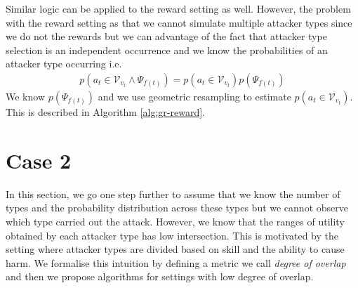 \documentclass[sigconf]{aamas}  %
\newcommand{\cal}[1]{\mathcal{#1}}
\theoremstyle{definition}
\theoremstyle{definition}
\begin{document}
Similar logic can be applied to the reward setting as well. However, the problem with the reward setting as that we cannot simulate multiple attacker types since we do not the rewards but we can advantage of the fact that attacker type selection is an independent occurrence and we know the probabilities of an attacker type occurring i.e.
\begin{align*}
    p(a_t \in \cal V_{v_t} \land \Psi_{f(t)}) = p(a_t \in \cal V_{v_t}) p(\Psi_{f(t)}) 
\end{align*}
We know $p(\Psi_{f(t)})$ and we use geometric resampling to estimate $p(a_t \in \cal V_{v_t})$. This is described in Algorithm \ref{alg:gr-reward}.


\section{Case 2}\label{sec:case2}
In this section, we go one step further to assume that we know the number of types and the probability distribution across these types but we cannot observe which type carried out the attack. However, we know that the ranges of utility obtained by each attacker type has low intersection. This is motivated by the setting where attacker types are divided based on skill and the ability to cause harm. We formalise this intuition by defining a metric we call {\em degree of overlap} and then we propose algorithms for settings with low degree of overlap.
\end{document}
